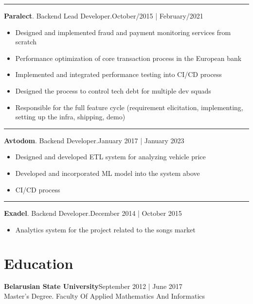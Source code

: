 \documentclass{article}
\begin{document}
\par\noindent\rule{\textwidth}{0.4pt}
\textbf{Paralect}. Backend Lead Developer.\hspace*{0pt}\hfill October/2015 | February/2021
\begin{itemize}
    \item Designed and implemented fraud and payment monitoring services from scratch
    \item Performance optimization of core transaction process in the European bank
    \item Implemented and integrated performance testing into CI/CD process
    \item Designed the process to control tech debt for multiple dev squads
    \item Responsible for the full feature cycle (requirement elicitation, implementing, setting up the infra, shipping, demo)
\end{itemize}
\par\noindent\rule{\textwidth}{0.4pt}
\textbf{Avtodom}. Backend Developer.\hspace*{0pt}\hfill January 2017 | January 2023
\begin{itemize}
    \item Designed and developed ETL system for analyzing vehicle price
    \item Developed and incorporated ML model into the system above
    \item CI/CD process
\end{itemize}
\par\noindent\rule{\textwidth}{0.4pt}
\textbf{Exadel}. Backend Developer.\hspace*{0pt}\hfill December 2014 | October 2015

\begin{itemize}
\item Analytics system for the project related to the songs market
\end{itemize}

\vspace{-1.5em}
\section*{Education}
\textbf{Belarusian State University}\hspace*{0pt}\hfill September 2012 | June 2017 \\
Master's Degree. Faculty Of Applied Mathematics And Informatics
\end{document}
